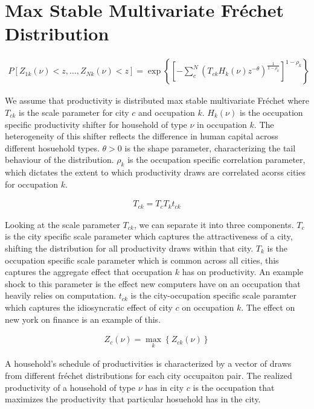 \documentclass[10pt]{article}
\begin{document}
\section{Max Stable Multivariate Fr\'{e}chet Distribution}

\begin{align}
    P[Z_{1k}(\nu) < z, \dots, Z_{Nk}(\nu) < z] = \exp \left\{ \left[ - \sum_{c}^{N} (T_{ck} H_k(\nu) z^{- \theta})^{\frac{1}{1 - \rho_k}} \right]^{1 - \rho_k} \right\}
\end{align}

We assume that productivity is distributed max stable multivariate Fr\'{e}chet where $T_{ck}$ is the scale parameter for city $c$ and occupation $k$. $H_k(\nu)$ is the occupation specific productivity shifter for household of type $\nu$ in occupation $k$. The heterogeneity of this shifter reflects the difference in human capital across different hosuehold types. $\theta > 0$ is the shape parameter, characterizing the tail behaviour of the distribution. $\rho_k$ is the occupation specific correlation parameter, which dictates the extent to which productivity draws are correlated acorss cities for occupation $k$.

\begin{align}
    T_{ck} = T_c T_k t_{ck}
\end{align}

Looking at the scale parameter $T_{ck}$, we can separate it into three components. $T_c$ is the city specific scale parameter which captures the attractiveness of a city, shifting the distribution for all productivity draws within that city. $T_k$ is the occupation specific scale parameter which is common across all cities, this captures the aggregate effect that occupation $k$ has on productivity. An example shock to this parameter is the effect new computers have on an occupation that heavily relies on computation. $t_{ck}$ is the city-occupation specific scale paramter which captures the idiosyncratic effect of city $c$ on occupation $k$. The effect on new york on finance is an example of this.

\begin{align}
    Z_c(\nu) = \max_k \left\{ Z_{ck} (\nu) \right\}
\end{align}

A household's schedule of productivities is characterized by a vector of draws from different fr\'{e}chet distributions for each city occupaiton pair. The realized productivity of a household of type $\nu$ has in city $c$ is the occupation that maximizes the productivity that particular hosuehold has in the city.
\end{document}
